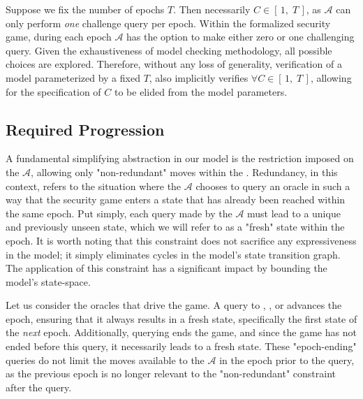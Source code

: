 \documentclass[runningheads]{llncs}
\newcommand{\Adversary}{\ensuremath{\mathcal{A}}\xspace}
\newcommand{\NumericRange}[2]{\ensuremath{\left[\,#1,\; #2\,\right]}\xspace}
\begin{document}
Suppose we fix the number of epochs $T$.
Then necessarily $C \in \NumericRange{1}{T}$, as \Adversary can only perform \emph{one} challenge query per epoch.
Within the formalized security game, during each epoch \Adversary has the option to make either zero or one challenging query.
Given the exhaustiveness of model checking methodology, all possible choices are explored.
Therefore, without any loss of generality, verification of a model parameterized by a fixed $T$, also implicitly verifies $\forall C \in \NumericRange{1}{T}$, allowing for the specification of $C$ to be elided from the model parameters.




\subsection{Required Progression\label{sec:abstraction-progression}}

A fundamental simplifying abstraction in our model is the restriction imposed on the \Adversary, allowing only "non-redundant" moves within the \CGKAsec. 
Redundancy, in this context, refers to the situation where the \Adversary chooses to query an oracle in such a way that the security game enters a state that has already been reached within the same epoch.
Put simply, each query made by the \Adversary must lead to a unique and previously unseen state, which we will refer to as a "fresh" state within the epoch.
It is worth noting that this constraint does not sacrifice any expressiveness in the model; it simply eliminates cycles in the model's state transition graph.
The application of this constraint has a significant impact by bounding the model's state-space.

Let us consider the oracles that drive the game. A query to , , or  advances the epoch, ensuring that it always results in a fresh state, specifically the first state of the \emph{next} epoch.
Additionally, querying  ends the game, and since the game has not ended before this query, it necessarily leads to a fresh state.
These "epoch-ending" queries do not limit the moves available to the \Adversary in the epoch prior to the query, as the previous epoch is no longer relevant to the "non-redundant" constraint after the query.
\end{document}
